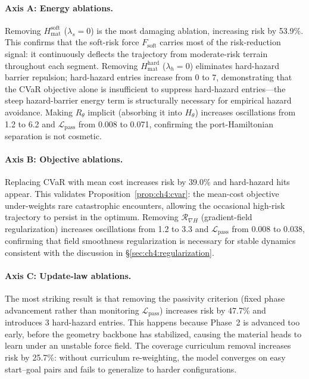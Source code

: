 \paragraph{Axis A: Energy ablations.}
Removing $H_{\mathrm{mat}}^{\mathrm{soft}}$ ($\lambda_s=0$) is the
most damaging ablation, increasing risk by 53.9\%.
This confirms that the soft-risk force $F_{\mathrm{soft}}$ carries most
of the risk-reduction signal: it continuously deflects the trajectory
from moderate-risk terrain throughout each segment.
Removing $H_{\mathrm{mat}}^{\mathrm{hard}}$ ($\lambda_h=0$) eliminates
hard-hazard barrier repulsion; hard-hazard entries increase from 0 to 7,
demonstrating that the CVaR objective alone is insufficient to suppress
hard-hazard entries—the steep hazard-barrier energy term is structurally
necessary for empirical hazard avoidance.
Making $R_\theta$ implicit (absorbing it into $H_\theta$) increases
oscillations from 1.2 to 6.2 and $\mathcal{L}_{\mathrm{pass}}$ from
0.008 to 0.071, confirming the port-Hamiltonian separation is not
cosmetic.

\paragraph{Axis B: Objective ablations.}
Replacing CVaR with mean cost increases risk by 39.0\% and hard-hazard
hits appear.
This validates Proposition~\ref{prop:ch4:cvar}: the mean-cost objective
under-weights rare catastrophic encounters, allowing the occasional
high-risk trajectory to persist in the optimum.
Removing $\mathcal{R}_{\nabla H}$ (gradient-field regularization)
increases oscillations from 1.2 to 3.3 and $\mathcal{L}_{\mathrm{pass}}$
from 0.008 to 0.038, confirming that field smoothness regularization
is necessary for stable dynamics consistent with the discussion in
§\ref{sec:ch4:regularization}.

\paragraph{Axis C: Update-law ablations.}
The most striking result is that removing the passivity criterion (fixed
phase advancement rather than monitoring $\mathcal{L}_{\mathrm{pass}}$)
increases risk by 47.7\% and introduces 3 hard-hazard entries.
This happens because Phase~2 is advanced too early, before the geometry
backbone has stabilized, causing the material heads to learn under an
unstable force field.
The coverage curriculum removal increases risk by 25.7\%: without
curriculum re-weighting, the model converges on easy start–goal pairs
and fails to generalize to harder configurations.

